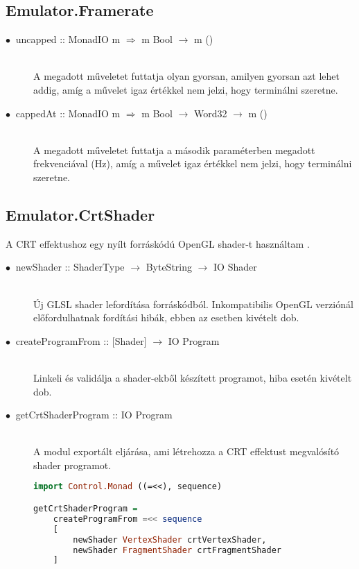 \subsection{Emulator.Framerate}

\begin{description}
	\item[$\bullet\:$ uncapped :: MonadIO m $\Rightarrow$ m Bool $\rightarrow$ m ()] \hfill \\
	A megadott műveletet futtatja olyan gyorsan, amilyen gyorsan azt lehet addig, amíg a művelet igaz értékkel nem jelzi, hogy terminálni szeretne.
	\item[$\bullet\:$ cappedAt :: MonadIO m $\Rightarrow$ m Bool $\rightarrow$ Word32 $\rightarrow$ m ()] \hfill \\
	A megadott műveletet futtatja a második paraméterben megadott frekvenciával (Hz), amíg a művelet igaz értékkel nem jelzi, hogy terminálni szeretne.
\end{description}

\subsection{Emulator.CrtShader}

A CRT effektushoz egy nyílt forráskódú OpenGL shader-t használtam \cite{crtshader}.

\begin{description}
	\item[$\bullet\:$ newShader :: ShaderType $\rightarrow$ ByteString $\rightarrow$ IO Shader] \hfill \\
	Új GLSL shader lefordítása forráskódból. Inkompatibilis OpenGL verziónál előfordulhatnak fordítási hibák, ebben az esetben kivételt dob.
	\item[$\bullet\:$ createProgramFrom :: $\lbrack$Shader$\rbrack$ $\rightarrow$ IO Program] \hfill \\
	Linkeli és validálja a shader-ekből készített programot, hiba esetén kivételt dob.
	\item[$\bullet\:$ getCrtShaderProgram :: IO Program] \hfill \\
	A modul exportált eljárása, ami létrehozza a CRT effektust megvalósító shader programot.
\vspace{0.2cm}
\begin{lstlisting}[language=Haskell, basicstyle=\scriptsize]
import Control.Monad ((=<<), sequence)

getCrtShaderProgram = 
	createProgramFrom =<< sequence 
	[
		newShader VertexShader crtVertexShader, 
		newShader FragmentShader crtFragmentShader
	]
\end{lstlisting}
\end{description}

